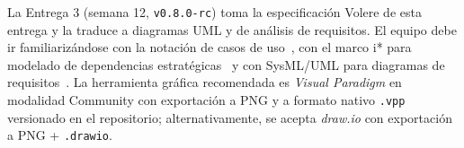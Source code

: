 \documentclass[11pt,a4paper]{article}
\begin{document}
La Entrega 3 (semana 12, \texttt{v0.8.0-rc}) toma la especificaci\'on Volere de esta entrega y la traduce a diagramas UML y de an\'alisis de requisitos. El equipo debe ir familiariz\'andose con la notaci\'on de casos de uso~\cite{cockburn2001usecases,fowler2018uml,booch2005uml}, con el marco i* para modelado de dependencias estrat\'egicas~\cite{yu1997istar,dardenne1993kaos} y con SysML/UML para diagramas de requisitos~\cite{weilkiens2011sysml,hause2006sysml}. La herramienta gr\'afica recomendada es \emph{Visual Paradigm} en modalidad Community con exportaci\'on a PNG y a formato nativo \texttt{.vpp} versionado en el repositorio; alternativamente, se acepta \emph{draw.io} con exportaci\'on a PNG + \texttt{.drawio}.



\end{document}

